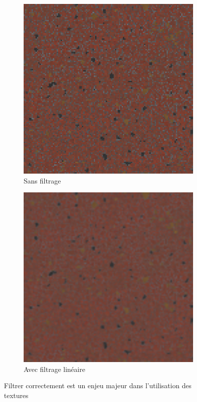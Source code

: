 \bigskip

\begin{figure}
    \centering
    \begin{subfigure}[b]{.45\textwidth}
        \includegraphics[width=\textwidth]{contenu/resources/images/porcelain_no_filter}
        \caption{Sans filtrage}
    \end{subfigure}
    \hfill
    \begin{subfigure}[b]{.45\textwidth}
        \includegraphics[width=\textwidth]{contenu/resources/images/porcelain_filter}
         \caption{Avec filtrage linéaire}
     \end{subfigure}
    \caption{Filtrer correctement est un enjeu majeur dans l'utilisation des textures}
    \label{fig:filtering}
\end{figure}

